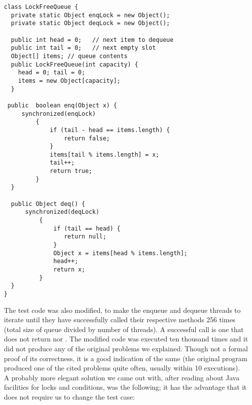 \newpage
\begin{lstlisting}[style=nonumbers]
class LockFreeQueue {
  private static Object enqLock = new Object();
  private static Object deqLock = new Object();
    
  public int head = 0;   // next item to dequeue
  public int tail = 0;   // next empty slot
  Object[] items; // queue contents
  public LockFreeQueue(int capacity) {
    head = 0; tail = 0;
    items = new Object[capacity];
  }

 public  boolean enq(Object x) {
     synchronized(enqLock)
         {
             if (tail - head == items.length) {
                 return false;
             }
             items[tail % items.length] = x;
             tail++;
             return true;
         }
  }

  public Object deq() {
      synchronized(deqLock)
          {
              if (tail == head) {
                 return null;
              }
              Object x = items[head % items.length];
              head++;
              return x;
          }
  }
}

\end{lstlisting}
\hfill
\newpage

The test code was also modified, to make the enqueue and dequeue
threads to iterate until they have successfully called their
respective methods 256 times (total size of queue divided by number of
threads). A successful call is one that does not return  nor
. The modified code was executed ten thousand times and it did
not produce any of the original problems we explained. Though not a
formal proof of its correctness, it is a good indication of the same
(the original program produced one of the cited problems quite often,
usually within 10 executions). \\

A probably more elegant solution we came out with, after reading about
Java facilities for locks and conditions, was the following; it has
the advantage that it does not require us to change the test case: \\ 

